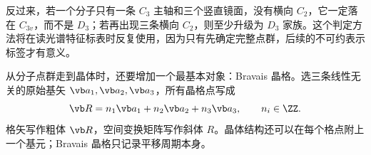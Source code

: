 反过来，若一个分子只有一条 $C_3$ 主轴和三个竖直镜面，没有横向 $C_2$，它一定落在 $C_{3v}$，而不是 $D_3$；若再出现三条横向 $C_2$，则至少升级为 $D_3$ 家族。这个判定方法将在读光谱特征标表时反复使用，因为只有先确定完整点群，后续的不可约表示标签才有意义。

从分子点群走到晶体时，还要增加一个最基本对象：Bravais 晶格。选三条线性无关的原始基矢 $\vb a_1,\vb a_2,\vb a_3$，所有晶格点写成
\[
\vb R=n_1\vb a_1+n_2\vb a_2+n_3\vb a_3,
\qquad n_i\in\ZZ.
\]
格矢写作粗体 $\vb R$，空间变换矩阵写作斜体 $R$。晶体结构还可以在每个格点附上一个基元；Bravais 晶格只记录平移周期本身。
